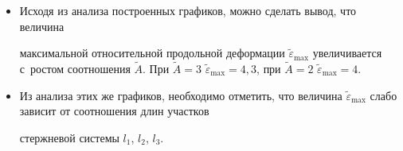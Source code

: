 \begin{itemize}

\item[1.]

Исходя из анализа построенных графиков, можно сделать вывод, что величина

максимальной относительной продольной деформации $\tilde {\varepsilon

}_{\max }$ увеличивается с~ростом соотношения $\tilde {A}$. При $\tilde

{A}=3$ $\tilde {\varepsilon}_{\max }=4,3$, при $\tilde

{A}=2$ $\tilde {\varepsilon }_{\max}=4$.



\item[2.]

Из анализа этих же графиков, необходимо отметить, что величина $\tilde

{\varepsilon }_{\max }$ слабо зависит от соотношения длин участков

стержневой системы $l_1$, $l_2$, $l_3$.

\end{itemize}





